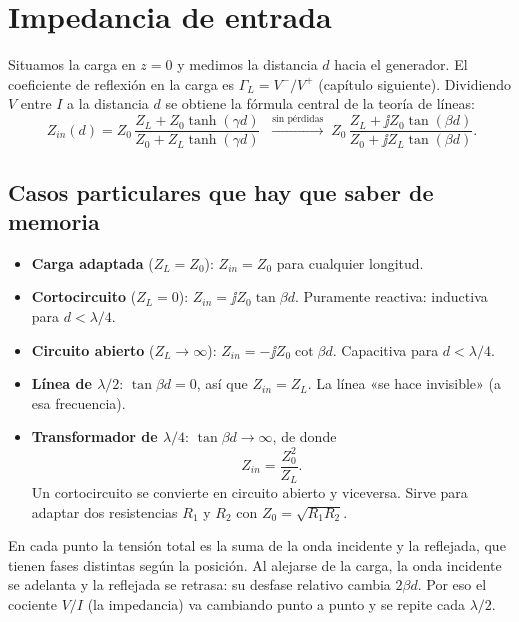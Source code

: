 \section{Impedancia de entrada}

Situamos la carga en $z = 0$ y medimos la distancia $d$ hacia el generador. El coeficiente de reflexión en la carga es
$\Gamma_L = V^-/V^+$ (capítulo siguiente). Dividiendo $V$ entre $I$ a la distancia $d$ se obtiene la fórmula central de la teoría de líneas:
\begin{equation}
  \boxed{\;Z_{in}(d) = Z_0\,\frac{Z_L + Z_0\tanh(\gamma d)}{Z_0 + Z_L\tanh(\gamma d)}\;}
  \;\xrightarrow{\text{sin pérdidas}}\;
  Z_0\,\frac{Z_L + \jj Z_0\tan(\beta d)}{Z_0 + \jj Z_L\tan(\beta d)} .
\end{equation}
\begin{donde}
\end{donde}

\subsection{Casos particulares que hay que saber de memoria}
\begin{itemize}
\item \textbf{Carga adaptada} ($Z_L = Z_0$): $Z_{in} = Z_0$ para cualquier longitud.
\item \textbf{Cortocircuito} ($Z_L = 0$): $Z_{in} = \jj Z_0\tan\beta d$. Puramente reactiva: inductiva para $d < \lambda/4$.
\item \textbf{Circuito abierto} ($Z_L\to\infty$): $Z_{in} = -\jj Z_0\cot\beta d$. Capacitiva para $d < \lambda/4$.
\item \textbf{Línea de $\lambda/2$}: $\tan\beta d = 0$, así que $Z_{in} = Z_L$. La línea «se hace invisible» (a esa frecuencia).
\item \textbf{Transformador de $\lambda/4$}: $\tan\beta d \to \infty$, de donde
\begin{equation}
  Z_{in} = \frac{Z_0^2}{Z_L} .
\end{equation}
Un cortocircuito se convierte en circuito abierto y viceversa. Sirve para adaptar dos resistencias $R_1$ y $R_2$ con $Z_0 = \sqrt{R_1R_2}$.
\end{itemize}

\begin{intuicion}
En cada punto la tensión total es la suma de la onda incidente y la reflejada, que tienen fases distintas según la posición.
Al alejarse de la carga, la onda incidente se adelanta y la reflejada se retrasa: su desfase relativo cambia $2\beta d$. Por eso el
cociente $V/I$ (la impedancia) va cambiando punto a punto y se repite cada $\lambda/2$.
\end{intuicion}

